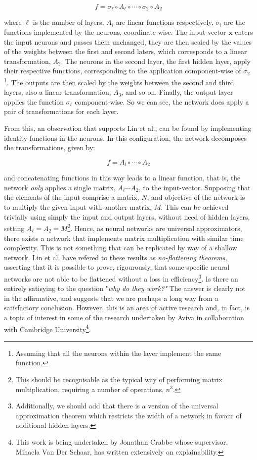 \documentclass[11pt]{article}
\begin{document}
\begin{equation}f = \sigma_{\ell} \circ A_{\ell} \circ \cdots \circ \sigma_{2} \circ A_{2}\nonumber\end{equation}

where $\ell$ is the number of layers, $A_{i}$ are linear functions respectively, $\sigma_{i}$ are the functions implemented by the neurons, coordinate-wise. The input-vector $\textbf{x}$ enters the input neurons and passes them unchanged, they are then scaled by the values of the weights between the first and second laters, which corresponds to a linear transformation, $A_{2}$. The neurons in the second layer, the first hidden layer, apply their respective functions, corresponding to the application component-wise of $\sigma_{2}$\footnote{Assuming that all the neurons within the layer implement the same function.}. The outputs are then scaled by the weights between the second and third layers, also a linear transformation, $A_{3}$, and so on. Finally, the output layer applies the function $\sigma_{\ell}$ component-wise. So we can see, the network does apply a pair of transformations for each layer.

From this, an observation that supports Lin et al., can be found by implementing identity functions in the neurons. In this configuration, the network decomposes the transformations, given by:

\begin{equation}f = A_{l} \circ \cdots \circ A_{2}\nonumber\end{equation}

and concatenating functions in this way leads to a linear function, that is, the network \textit{only} applies a single matrix, $A_{\ell} \cdots A_{2}$, to the input-vector. Supposing that the elements of the input comprise a matrix, $N$, and objective of the network is to multiply the given input with another matrix, $M$. This can be achieved trivially using simply the input and output layers, without need of hidden layers, setting $A_{\ell} = A_{2} = M$\footnote{This should be recognisable as the typical way of performing matrix multiplication, requiring a number of operations, $n^{3}$.}. Hence, as neural networks are universal approximators, there exists a network that implements matrix multiplication with similar time complexity. This is not something that can be replicated by way of a shallow network. Lin et al. have refered to these results as \textit{no-flattening theorems}, asserting that it is possible to prove, rigourously, that some specific neural networks are not able to be flattened without a loss in efficiency\footnote{Additionally, we should add that there is a version of the universal approximation theorem which restricts the width of a network in favour of additional hidden layers.}. Is there an entirely satisying to the question "\textit{why do they work?"} The answer is clearly not in the affirmative, and suggests that we are perhaps a long way from a satisfactory conclusion. However, this is an area of active research and, in fact, is a topic of interest in some of the research undertaken by Aviva in collaboration with Cambridge University\footnote{This work is being undertaken by Jonathan Crabbe whose supervisor, Mihaela Van Der Schaar, has written extensively on explainability.}.
\end{document}

